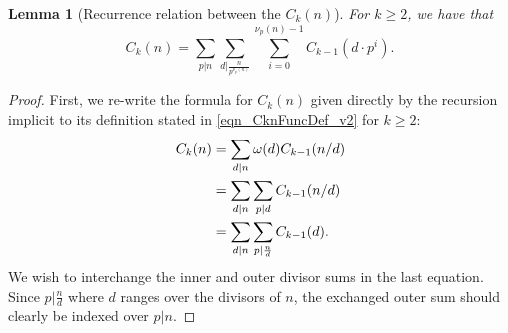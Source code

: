 \documentclass[11pt,reqno,a4letter]{article}
\numberwithin{figure}{section}
\numberwithin{table}{section}
\theoremstyle{plain}
\newtheorem{lemma}[theorem]{Lemma}
\numberwithin{theorem}{section}
\theoremstyle{definition}
\begin{document}
\begin{lemma}[Recurrence relation between the $C_k(n)$] 
\label{lemma_Ckn_recFormula_v1} 
For $k \geq 2$, we have that 
\begin{equation}
\label{eqn_Ckn_recFormula_v1} 
C_k(n) = \sum_{p|n} \sum_{d\bigr\rvert\frac{n}{p^{\nu_p(n)}}} \sum_{i=0}^{\nu_p(n)-1} C_{k-1}\left(d \cdot p^i\right). 
\end{equation}
\end{lemma} 
\begin{proof} 
First, we re-write the formula for $C_k(n)$ given directly by the recursion implicit to its 
definition stated in \eqref{eqn_CknFuncDef_v2} for $k \geq 2$:
\begin{align} 
\notag 
C_k(n) & = \sum_{d|n} \omega(d) C_{k-1}(n/d) \\ 
\notag 
     & = \sum_{d|n} \sum_{p|d} C_{k-1}(n/d) \\ 
\label{eqn_proof_tag_Ckn_rec_divSumExp_v1} 
     & = \sum_{d|n} \sum_{p|\frac{n}{d}} C_{k-1}(d). 
\end{align} 
We wish to interchange the inner and outer divisor sums in the last equation. 
Since $p|\frac{n}{d}$ where $d$ ranges over the divisors of $n$, the exchanged outer sum should 
clearly be indexed over $p|n$. 


\end{proof}
\end{document}

